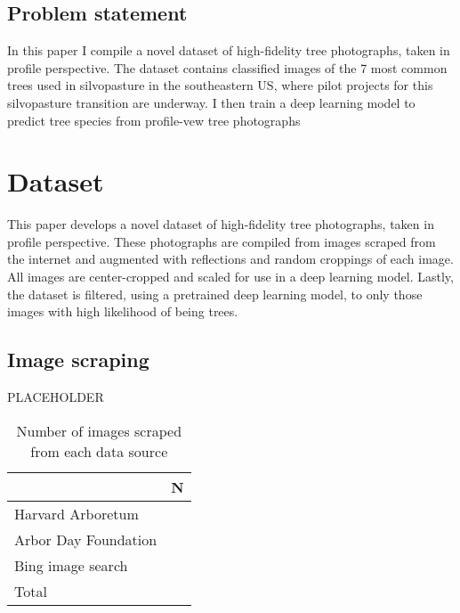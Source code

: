 \documentclass[10pt,twocolumn,letterpaper]{article}
\begin{document}
\subsection{Problem statement}

In this paper I compile a novel dataset of high-fidelity tree photographs, taken in profile perspective. The dataset contains classified images of the 7 most common trees used in silvopasture in the southeastern US, where pilot projects for this silvopasture transition are underway. I then train a deep learning model to predict tree species from profile-vew tree photographs


\section{Dataset}

This paper develops a novel dataset of high-fidelity tree photographs, taken in profile perspective. These photographs are compiled from images scraped from the internet and augmented with reflections and random croppings of each image. All images are center-cropped and scaled for use in a deep learning model. Lastly, the dataset is filtered, using a pretrained deep learning model, to only those images with high likelihood of being trees. 

\subsection{Image scraping}

PLACEHOLDER

\begin{table}
   \begin{center}
   \begin{tabular}{|l|c|}
   \hline
   & N \\
   \hline\hline
   Harvard Arboretum & \\
   Arbor Day Foundation & \\
   Bing image search & \\
   \hline\hline
   Total & \\
   \hline
   \end{tabular}
   \end{center}
   \caption{Number of images scraped from each data source}
   \end{table}
\end{document}
